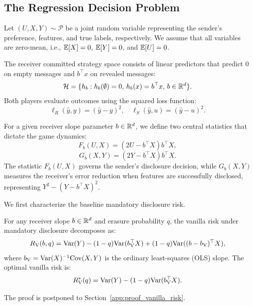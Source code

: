 \subsection{The Regression Decision Problem}
\label{sec:regression_decision}
Let $(U, X, Y) \sim \mathcal{P}$ be a joint random variable representing the sender's preference, features, and true labels, respectively. We assume that all variables are zero-mean, i.e., $\mathbb{E}[X] = 0$, $\mathbb{E}[Y] = 0$, and $\mathbb{E}[U] = 0$. 

The receiver committed strategy space consists of linear predictors that predict $0$ on empty messages and $b^\top x$ on revealed messages:
\begin{equation}
    \mathcal{H} = \{h_b : h_b(\emptyset) = 0, \, h_b(x) = b^\top x, \, b \in \mathbb{R}^d\}.
\end{equation}
Both players evaluate outcomes using the squared loss function:
\begin{equation}
    \ell_R(\hat{y}, y) = (\hat{y} - y)^2, \quad \ell_S(\hat{y}, u) = (\hat{y} - u)^2.
\end{equation}

For a given receiver slope parameter $b \in \mathbb{R}^d$, we define two central statistics that dictate the game dynamics:
\begin{equation}
    \label{eq:Fb_def}
    F_b(U, X) = (2U - b^\top X)b^\top X,
\end{equation}
\begin{equation}
    \label{eq:Gb_def}
    G_b(X, Y) = (2Y - b^\top X)b^\top X.
\end{equation}
The statistic $F_b(U, X)$ governs the sender's disclosure decision, while $G_b(X, Y)$ measures the receiver's error reduction when features are successfully disclosed, representing $Y^2 - (Y - b^\top X)^2$.

We first characterize the baseline mandatory disclosure risk.
\begin{lemma}
\label{lem:vanilla_risk}
For any receiver slope $b \in \mathbb{R}^d$ and erasure probability $q$, the vanilla risk under mandatory disclosure decomposes as:
\begin{equation}
    \label{eq:vanilla_risk_decomp}
    R_{\mathrm{V}}(b, q) = \mathrm{Var}(Y) - (1 - q)\mathrm{Var}(b_{\mathrm{V}}^\top X) + (1 - q)\mathrm{Var}((b - b_{\mathrm{V}})^\top X),
\end{equation}
where $b_{\mathrm{V}} = \mathrm{Var}(X)^{-1}\mathrm{Cov}(X, Y)$ is the ordinary least-squares (OLS) slope. The optimal vanilla risk is:
\begin{equation}
    \label{eq:opt_vanilla_risk}
    R_{\mathrm{V}}^*(q) = \mathrm{Var}(Y) - (1 - q)\mathrm{Var}(b_{\mathrm{V}}^\top X).
\end{equation}
\end{lemma}
The proof is postponed to Section~\ref{app:proof_vanilla_risk}.

